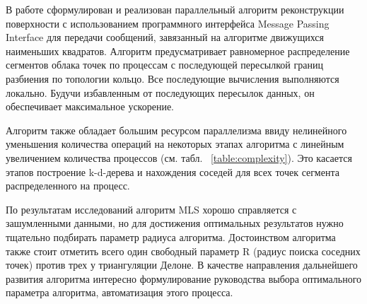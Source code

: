 В работе сформулирован и реализован параллельный алгоритм реконструкции поверхности с использованием программного интерфейса Message Passing Interface для передачи сообщений, завязанный на алгоритме движущихся наименьших квадратов. Алгоритм предусматривает равномерное распределение сегментов облака точек по процессам с последующей пересылкой границ разбиения по топологии кольцо. Все последующие вычисления выполняются локально. Будучи избавленным от последующих пересылок данных, он обеспечивает максимальное ускорение.

Алгоритм также обладает большим ресурсом параллелизма ввиду нелинейного уменьшения количества операций на некоторых этапах алгоритма  с линейным увеличением количества процессов (см. табл. ~\ref{table:complexity}). Это касается этапов построение k-d-дерева и нахождения соседей для всех точек сегмента распределенного на процесс.

По результатам исследований алгоритм MLS хорошо справляется с зашумленными данными, но для достижения оптимальных результатов нужно тщательно подбирать параметр радиуса алгоритма. Достоинством алгоритма также стоит отметить всего один свободный параметр R (радиус поиска соседних точек) против трех у триангуляции Делоне. В качестве направления дальнейшего развития алгоритма интересно формулирование руководства выбора оптимального параметра алгоритма, автоматизация этого процесса.

